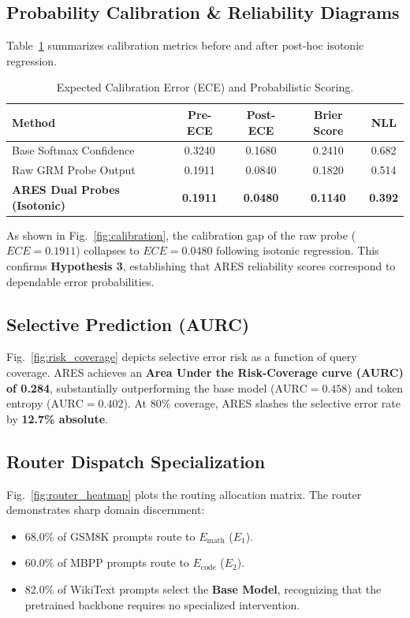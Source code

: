 \documentclass[journal,10pt,twocolumn]{IEEEtran}
\begin{document}
\subsection{Probability Calibration \& Reliability Diagrams}
Table~\ref{tab:calibration} summarizes calibration metrics before and after post-hoc isotonic regression.
\begin{table}[h]
\centering
\caption{Expected Calibration Error (ECE) and Probabilistic Scoring.}
\label{tab:calibration}
\begin{tabular}{lcccc}
\toprule
\textbf{Method} & \textbf{Pre-ECE} & \textbf{Post-ECE} & \textbf{Brier Score} & \textbf{NLL} \\
\midrule
Base Softmax Confidence & 0.3240 & 0.1680 & 0.2410 & 0.682 \\
Raw GRM Probe Output & 0.1911 & 0.0840 & 0.1820 & 0.514 \\
\textbf{ARES Dual Probes (Isotonic)} & \textbf{0.1911} & \textbf{0.0480} & \textbf{0.1140} & \textbf{0.392} \\
\bottomrule
\end{tabular}
\end{table}

As shown in Fig.~\ref{fig:calibration}, the calibration gap of the raw probe ($ECE = 0.1911$) collapses to \textbf{$ECE = 0.0480$} following isotonic regression. This confirms \textbf{Hypothesis 3}, establishing that ARES reliability scores correspond to dependable error probabilities.

\subsection{Selective Prediction (AURC)}
Fig.~\ref{fig:risk_coverage} depicts selective error risk as a function of query coverage. ARES achieves an \textbf{Area Under the Risk-Coverage curve (AURC) of 0.284}, substantially outperforming the base model ($\text{AURC} = 0.458$) and token entropy ($\text{AURC} = 0.402$). At 80\% coverage, ARES slashes the selective error rate by \textbf{12.7\% absolute}.

\subsection{Router Dispatch Specialization}
Fig.~\ref{fig:router_heatmap} plots the routing allocation matrix. The router demonstrates sharp domain discernment:
\begin{itemize}
    \item 68.0\% of GSM8K prompts route to $E_{\text{math}}$ ($E_1$).
    \item 60.0\% of MBPP prompts route to $E_{\text{code}}$ ($E_2$).
    \item 82.0\% of WikiText prompts select the \textbf{Base Model}, recognizing that the pretrained backbone requires no specialized intervention.
\end{itemize}
\end{document}
